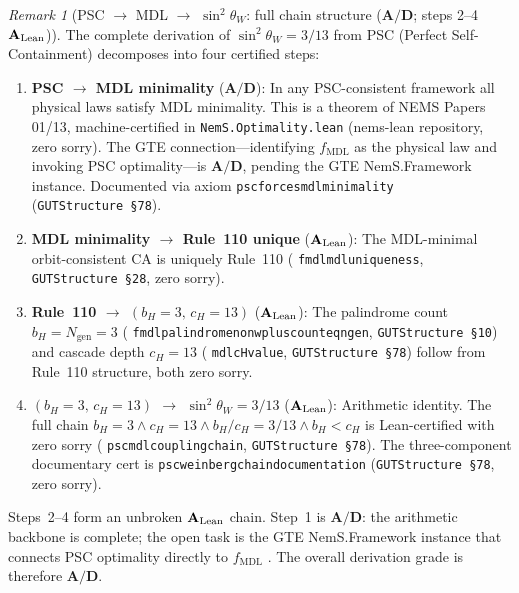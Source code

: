 \documentclass[11pt]{article}
\theoremstyle{remark}
\newtheorem{remark}[theorem]{Remark}
\newcommand{\lean}[1]{%
  \penalty-100
  \begingroup\def\_{\textunderscore\allowbreak}\texttt{#1}\endgroup}
\newcommand{\CatAL}{\ensuremath{\textbf{A}_{\rm Lean}}}
\newcommand{\CatAD}{\textbf{A/D}}
\begin{document}
\begin{remark}[PSC $\to$ MDL $\to$ $\sin^2\theta_W$: full chain structure ($\CatAD$; steps 2--4 $\CatAL$)]
\label{rem:psc_coupling_conjecture}
The complete derivation of $\sin^2\theta_W = 3/13$ from PSC (Perfect Self-Containment)
decomposes into four certified steps:

\begin{enumerate}
\item \textbf{PSC $\to$ MDL minimality} ($\CatAD$):
  In any PSC-consistent framework all physical laws satisfy MDL minimality.
  This is a theorem of NEMS Papers 01/13, machine-certified in \texttt{NemS.Optimality.lean}
  (nems-lean repository, zero sorry).
  The GTE connection---identifying $f_\mathrm{MDL}$ as the physical law and invoking PSC
  optimality---is $\CatAD$, pending the GTE NemS.Framework instance.
  Documented via axiom \lean{psc\_forces\_mdl\_minimality} (\texttt{GUTStructure~\S78}).

\item \textbf{MDL minimality $\to$ Rule~110 unique} ($\CatAL$):
  The MDL-minimal orbit-consistent CA is uniquely Rule~110
  (\lean{fmdl\_mdl\_uniqueness}, \texttt{GUTStructure~\S28}, zero sorry).

\item \textbf{Rule~110 $\to$ $(b_H{=}3,\,c_H{=}13)$} ($\CatAL$):
  The palindrome count $b_H = N_\mathrm{gen} = 3$
  (\lean{fmdl\_palindrome\_nonwplus\_count\_eq\_ngen}, \texttt{GUTStructure~\S10}) and
  cascade depth $c_H = 13$ (\lean{mdl\_c\_H\_value}, \texttt{GUTStructure~\S78}) follow
  from Rule~110 structure, both zero sorry.

\item \textbf{$(b_H{=}3,\,c_H{=}13)$ $\to$ $\sin^2\theta_W = 3/13$} ($\CatAL$):
  Arithmetic identity.  The full chain
  $b_H = 3 \land c_H = 13 \land b_H/c_H = 3/13 \land b_H < c_H$
  is Lean-certified with zero sorry
  (\lean{psc\_mdl\_coupling\_chain}, \texttt{GUTStructure~\S78}).
  The three-component documentary cert is \lean{psc\_weinberg\_chain\_documentation}
  (\texttt{GUTStructure~\S78}, zero sorry).
\end{enumerate}

Steps~2--4 form an unbroken $\CatAL$ chain.
Step~1 is $\CatAD$: the arithmetic backbone is complete; the open task is the
GTE NemS.Framework instance that connects PSC optimality directly to $f_\mathrm{MDL}$
.
The overall derivation grade is therefore $\CatAD$.
\end{remark}
\end{document}
